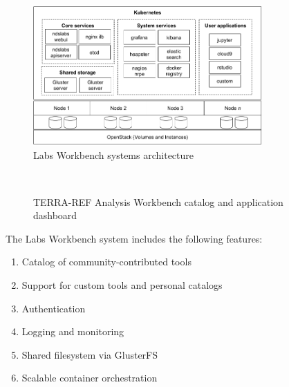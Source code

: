 \documentclass{sig-alternate}
\begin{document}
\begin{figure}[!ht]
\includegraphics[width=8.75cm]{architecture.png}
\caption{Labs Workbench systems architecture}
\label{fig.arch}
\end{figure}

\begin{figure}[!ht]
\\
\caption{TERRA-REF Analysis Workbench catalog and application dashboard}
\label{fig.ui}
\end{figure}

The Labs Workbench system includes the following features:
\begin{enumerate}
\itemsep-0.2em
\item Catalog of community-contributed tools 
\item Support for custom tools and personal catalogs
\item Authentication
\item Logging and monitoring
\item Shared filesystem via GlusterFS
\item Scalable container orchestration
\end{enumerate}
\end{document}
